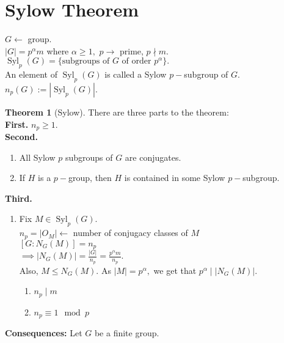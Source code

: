 \documentclass[12 pt, a4paper, toc=graduated, oneside]{article}
\theoremstyle{definition}
\newtheorem{theorem}{Theorem}
\newcommand{\Syl}{\operatorname{Syl}}
\begin{document}
\section{Sylow Theorem}
$G \longleftarrow $ group. \\
$|G| = p^\alpha m$ where $\alpha \ge 1,$ $p \to$ prime, $p \nmid m.$\\
$\Syl_p(G) = \{\text{subgroups of }G\text{ of order }p^\alpha\}.$\\
An element of $\Syl_p(G)$ is called a Sylow $p-$subgroup of $G.$\\
$n_p(G) := |\Syl_p(G)|.$

\begin{theorem}[Sylow]
	There are three parts to the theorem:\\
	\textbf{First.} $n_p \ge 1.$\\
	\textbf{Second.}
	\begin{enumerate}[nosep] 
		\item All Sylow $p$ subgroups of $G$ are conjugates.
		\item If $H$ is a $p-$group, then $H$ is contained in some Sylow $p-$subgroup.
	\end{enumerate}
	\textbf{Third.}
	\begin{enumerate}[nosep] 
		\item Fix $M \in \Syl_p(G).$\\
		$n_p = |O_M| \longleftarrow$ number of conjugacy classes of $M$\\
		$[G:N_G(M)] = n_p$\\
		$\implies |N_G(M)| = \frac{|G|}{n_p} = \frac{p^\alpha m}{n_p}.$\\
		Also, $M \le N_G(M).$ As $|M| = p^\alpha,$ we get that $p^\alpha \mid |N_G(M)|.$
		\begin{enumerate}[nosep] 
			\item $n_p \mid m$
			\item $n_p \equiv 1 \mod p$
		\end{enumerate}
	\end{enumerate}
\end{theorem}
\textbf{Consequences:} Let $G$ be a finite group.
\end{document}
